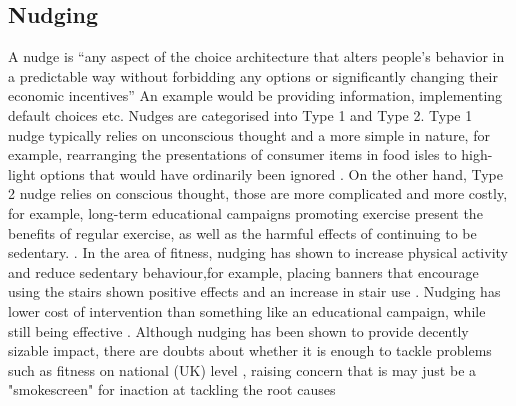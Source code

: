 \subsection{Nudging}
A nudge is “any aspect of the choice architecture that alters people's behavior in a predictable way without forbidding any options or significantly changing their economic incentives” \cite{nudgeDef} An example would be providing information, implementing default choices etc. Nudges are categorised into Type 1 and Type 2. Type 1 nudge typically relies on unconscious thought and a more simple in nature, for example, rearranging  the presentations of consumer items in food isles to high-light options that would have ordinarily been ignored \cite{NudgeCritical}. On the other hand, Type 2 nudge relies on conscious thought, those are more complicated and more costly, for example, long-term educational campaigns promoting exercise present the benefits of regular exercise, as well as the harmful effects of continuing to be sedentary. \cite{NudgeCritical}.  In the area of fitness, nudging has shown to increase physical activity and reduce sedentary behaviour,for example, placing banners that encourage using the stairs shown positive effects and an increase in stair use \cite{FORBERGER2022106922, Forberger2019}. Nudging has lower cost of intervention than something like an educational campaign, while still being effective \cite{nudgeCost}. Although nudging has been shown to provide decently sizable impact, there are doubts about whether it is enough to tackle problems such as fitness on national (UK) level , raising concern that is may just be a "smokescreen" for inaction at tackling the root causes  \cite{Raynerd2177}


